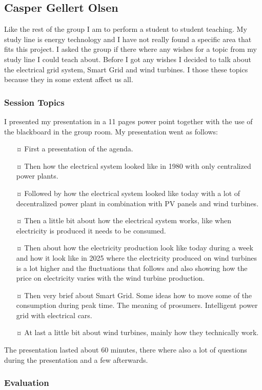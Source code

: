 \subsection{Casper Gellert Olsen}
Like the rest of the group I am to perform a student to student teaching. My study line is energy technology and I have not really found a specific area that fits this project. I asked the group if there where any wishes for a topic from my study line I could teach about. Before I got any wishes I decided to talk about the electrical grid system, Smart Grid and wind turbines. I those these topics because they in some extent affect us all.

\subsubsection{Session Topics}
I presented my presentation in a 11 pages power point together with the use of the blackboard in the group room. My presentation went as follows:
\begin{itemize}
\item[¤] First a presentation of the agenda.
\item[¤] Then how the electrical system looked like in 1980 with only centralized power plants. 
\item[¤] Followed by how the electrical system looked like today with a lot of decentralized power plant in combination with PV panels and wind turbines.
\item[¤] Then a little bit about how the electrical system works, like when electricity is produced it needs to be consumed.
\item[¤] Then about how the electricity production look like today during a week and how it look like in 2025 where the electricity produced on wind turbines is a lot higher and the fluctuations that follows and also showing how the price on electricity varies with the wind turbine production.
\item[¤] Then very brief about Smart Grid. Some ideas how to move some of the consumption during peak time. The meaning of prosumers. Intelligent power grid with electrical cars.
\item[¤] At last a little bit about wind turbines, mainly how they technically work.
\end{itemize}

The presentation lasted about 60 minutes, there where also a lot of questions during the presentation and a few afterwards.

\subsubsection{Evaluation}
